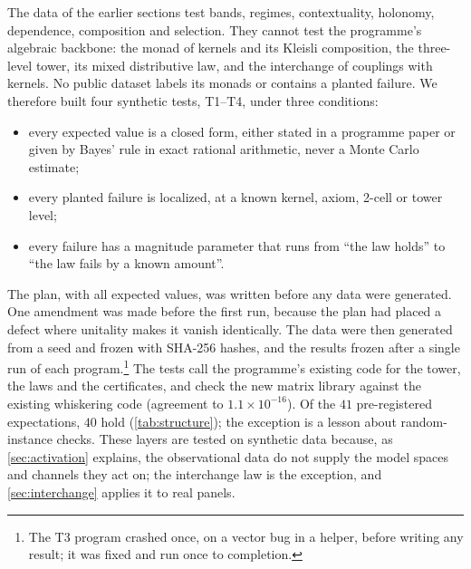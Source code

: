 \documentclass[11pt]{article}
\theoremstyle{definition}
\theoremstyle{remark}
\begin{document}
The data of the earlier sections test bands, regimes, contextuality, holonomy, dependence, composition and selection. They cannot test
the programme's algebraic backbone: the monad of kernels and its Kleisli composition, the three-level tower, its mixed distributive law,
and the interchange of couplings with kernels. No public dataset labels its monads or contains a planted failure. We therefore built
four synthetic tests, T1--T4, under three conditions:
\begin{itemize}[leftmargin=*,nosep]
\item every expected value is a closed form, either stated in a programme paper or given by Bayes' rule in exact rational arithmetic,
  never a Monte Carlo estimate;
\item every planted failure is localized, at a known kernel, axiom, 2-cell or tower level;
\item every failure has a magnitude parameter that runs from ``the law holds'' to ``the law fails by a known amount''.
\end{itemize}
The plan, with all expected values, was written before any data were generated. One amendment was made before the first run, because
the plan had placed a defect where unitality makes it vanish identically. The data were then generated from a seed and frozen with
SHA-256 hashes, and the results frozen after a single run of each program.\footnote{The T3 program crashed once, on a vector bug in a
helper, before writing any result; it was fixed and run once to completion.} The tests call the programme's existing code for the tower,
the laws and the certificates, and check the new matrix library against the existing whiskering code (agreement to $1.1\times10^{-16}$).
Of the $41$ pre-registered expectations, $40$ hold (\cref{tab:structure}); the exception is a lesson about random-instance checks. These layers are tested on synthetic data because, as \cref{sec:activation} explains, the observational data do not supply the model spaces and channels they act on; the interchange law is the exception, and \cref{sec:interchange} applies it to real panels.
\end{document}
